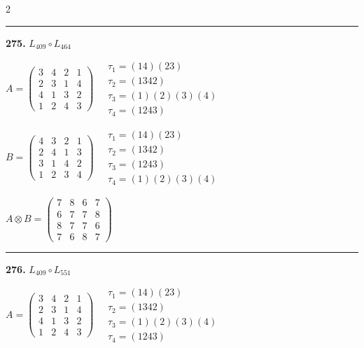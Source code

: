 \begin{multicols}{2}
\vspace{0.3em}
\hrule
\vspace{0.3em}

\noindent\textbf{275.} $L_{409} \circ L_{464}$

$A = \begin{pmatrix} 3 & 4 & 2 & 1 \\ 2 & 3 & 1 & 4 \\ 4 & 1 & 3 & 2 \\ 1 & 2 & 4 & 3 \end{pmatrix} \quad \begin{matrix} \tau_{1}=(1 4)(2 3) \\ \tau_{2}=(1 3 4 2) \\ \tau_{3}=(1)(2)(3)(4) \\ \tau_{4}=(1 2 4 3) \end{matrix}$

$B = \begin{pmatrix} 4 & 3 & 2 & 1 \\ 2 & 4 & 1 & 3 \\ 3 & 1 & 4 & 2 \\ 1 & 2 & 3 & 4 \end{pmatrix} \quad \begin{matrix} \tau_{1}=(1 4)(2 3) \\ \tau_{2}=(1 3 4 2) \\ \tau_{3}=(1 2 4 3) \\ \tau_{4}=(1)(2)(3)(4) \end{matrix}$

$A \otimes B = \begin{pmatrix} 7 & 8 & 6 & 7 \\ 6 & 7 & 7 & 8 \\ 8 & 7 & 7 & 6 \\ 7 & 6 & 8 & 7 \end{pmatrix}$

\vspace{0.3em}
\hrule
\vspace{0.3em}

\noindent\textbf{276.} $L_{409} \circ L_{551}$

$A = \begin{pmatrix} 3 & 4 & 2 & 1 \\ 2 & 3 & 1 & 4 \\ 4 & 1 & 3 & 2 \\ 1 & 2 & 4 & 3 \end{pmatrix} \quad \begin{matrix} \tau_{1}=(1 4)(2 3) \\ \tau_{2}=(1 3 4 2) \\ \tau_{3}=(1)(2)(3)(4) \\ \tau_{4}=(1 2 4 3) \end{matrix}$


\end{multicols}
